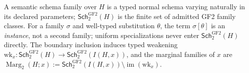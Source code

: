 \begin{definition}
\label{def:schema-family-instance}
A semantic schema family over \(H\) is a typed normal schema varying naturally
in its declared parameters; \(\mathsf{Sch}^{\mathrm{GF2}}_2(H)\) is the
finite set of admitted GF2 family
classes. For a family \(\sigma\) and well-typed substitution \(\theta\), the
term \(\sigma[\theta]\) is an \emph{instance}, not a second family; uniform
specializations never enter \(\mathsf{Sch}^{\mathrm{GF2}}_2(H)\) directly. The boundary
inclusion induces typed weakening
\(\mathrm{wk}_x:\mathsf{Sch}^{\mathrm{GF2}}_2(H)\to
\mathsf{Sch}^{\mathrm{GF2}}_2(I(H,x))\), and the marginal
families of \(x\) are
\(\operatorname{Marg}_2(H;x) :=
\mathsf{Sch}^{\mathrm{GF2}}_2(I(H,x))
\setminus\operatorname{im}(\mathrm{wk}_x)\).
\end{definition}

